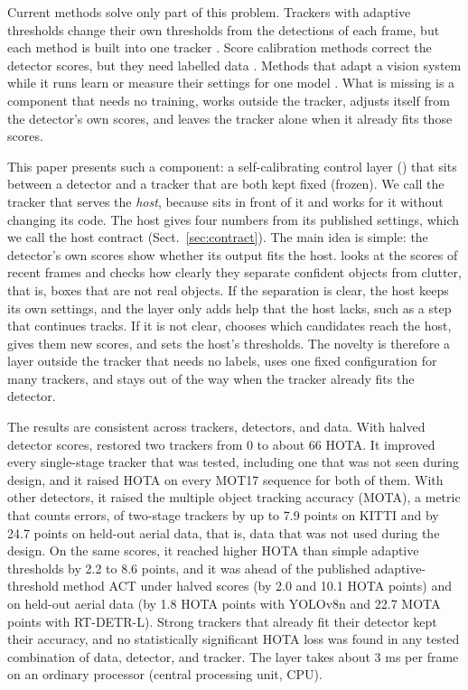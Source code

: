 Current methods solve only part of this problem. Trackers with adaptive
thresholds change their own thresholds from the detections of each frame, but
each method is built into one tracker
\cite{ma2023adaptivebytetrack,shim2024adaptrack,act2026adaptive}. Score
calibration methods correct the detector scores, but they need labelled data
\cite{kuppers2020detcalib}. Methods that adapt a vision system while it runs
learn or measure their settings for one model
\cite{han2022dynamic,jiang2018chameleon}. What is missing is a component that
needs no training, works outside the tracker, adjusts itself from the
detector's own scores, and leaves the tracker alone when it already fits those
scores.

This paper presents such a component: a self-calibrating control layer
(\scl{}) that sits between a detector and a tracker that are both kept fixed
(frozen). We call the tracker that \scl{} serves the \emph{host}, because
\scl{} sits in front of it and works for it without changing its code. The
host gives \scl{} four numbers from its published settings, which we call the
host contract (Sect.~\ref{sec:contract}). The main idea is simple: the
detector's own scores show whether its output fits the host. \scl{} looks at
the scores of recent frames and checks how clearly they separate confident
objects from clutter, that is, boxes that are not real objects. If the
separation is clear, the host keeps its own settings, and the layer only adds
help that the host lacks, such as a step that continues tracks. If it is not
clear, \scl{} chooses which candidates reach the host, gives them new scores,
and sets the host's thresholds. The novelty is therefore a layer outside the
tracker that needs no labels, uses one fixed configuration for many trackers,
and stays out of the way when the tracker already fits the detector.



The results are consistent across trackers, detectors, and data. With halved
detector scores, \scl{} restored two trackers from 0 to about 66 HOTA. It
improved every single-stage tracker that was tested, including one that was
not seen during design, and it raised HOTA on every MOT17 sequence for both of
them. With other detectors, it raised the multiple object tracking accuracy
(MOTA), a metric that counts errors, of two-stage trackers by up to 7.9 points
on KITTI and by 24.7 points on held-out aerial data, that is, data that was
not used during the design. On the same scores, it reached higher HOTA than
simple adaptive thresholds by 2.2 to 8.6 points, and it was ahead of the
published adaptive-threshold method ACT under halved scores (by 2.0 and 10.1
HOTA points) and on held-out aerial data (by 1.8 HOTA points with YOLOv8n and
22.7 MOTA points with RT-DETR-L). Strong trackers that already fit their
detector kept their accuracy, and no statistically significant HOTA loss was
found in any tested combination of data, detector, and tracker. The layer
takes about 3 ms per frame on an ordinary processor (central processing unit,
CPU).

